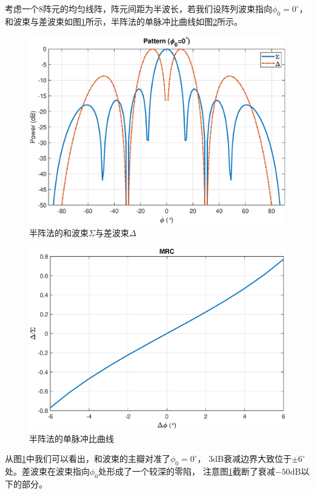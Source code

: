 \documentclass[master]{thesis-uestc}
\begin{document}
考虑一个$8$阵元的均匀线阵，阵元间距为半波长，若我们设阵列波束指向$\phi_0=0^\circ$，
和波束与差波束如图\ref{semi_sigma_delta}所示，半阵法的单脉冲比曲线如图\ref{semi_MRC}所示。
\begin{figure}[h]
\includegraphics[scale=0.4]{pic/semi_sigma_delta.eps}
\caption{半阵法的和波束$\Sigma$与差波束$\Delta$}
\label{semi_sigma_delta}
\end{figure}

\begin{figure}[h]
\includegraphics[scale=0.4]{pic/semi_MRC.eps}
\caption{半阵法的单脉冲比曲线}
\label{semi_MRC}
\end{figure}

从图\ref{semi_sigma_delta}中我们可以看出，和波束的主瓣对准了$\phi_0=0^\circ$，
$3$dB衰减边界大致位于$\pm6^\circ$处。差波束在波束指向$\phi_0$处形成了一个较深的零陷，
注意图\ref{semi_sigma_delta}截断了衰减$-50$dB以下的部分。
\end{document}

